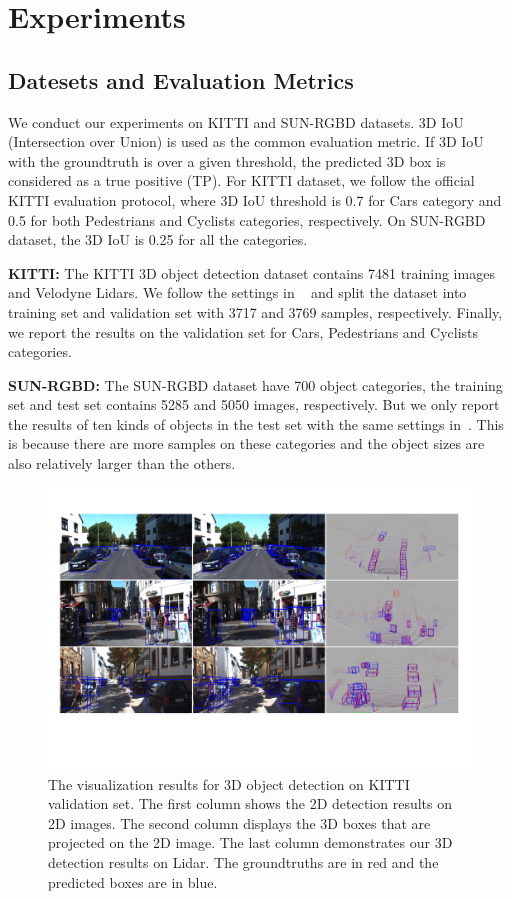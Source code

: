 \documentclass[letterpaper]{article}
\begin{document}
\section{Experiments}
\subsection{Datesets and Evaluation Metrics}
We conduct our experiments on KITTI and SUN-RGBD datasets. 3D IoU (Intersection over Union) is used as the common evaluation metric. If 3D IoU with the groundtruth is over a given threshold, the predicted 3D box is considered as a true positive (TP). For KITTI dataset, we follow the official KITTI evaluation protocol, where 3D IoU threshold is 0.7 for Cars category and 0.5 for both Pedestrians and Cyclists categories, respectively. On SUN-RGBD dataset, the 3D IoU is 0.25 for all the categories.

{\bf KITTI:} The KITTI 3D object detection dataset contains 7481 training images and Velodyne Lidars. We follow the settings in ~\cite{qi2017frustum} and split the dataset into training set and validation set with 3717 and 3769 samples, respectively. Finally, we report the results on the validation set for Cars, Pedestrians and Cyclists categories.

{\bf SUN-RGBD:} The SUN-RGBD dataset have 700 object categories, the training set and test set contains 5285 and 5050 images, respectively. But we only report the results of ten kinds of objects in the test set with the same settings in~\cite{qi2017frustum}. This is because there are more samples on these categories and the object sizes are also relatively larger than the others.



\begin{figure}[t]
\begin{center}
  \includegraphics[width=0.87\linewidth]{KITTI_Results.pdf}
\end{center}
\caption{The visualization results for 3D object detection on KITTI validation set. The first column shows the 2D detection results on 2D images. The second column displays the 3D boxes that are projected on the 2D image. The last column demonstrates our 3D detection results on Lidar. The groundtruths are in red and the predicted boxes are in blue.}
\end{figure}
\end{document}
